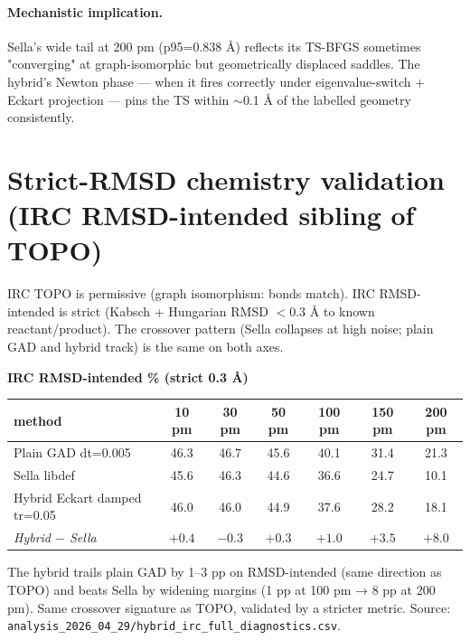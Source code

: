 \documentclass[11pt]{article}
\begin{document}
\paragraph{Mechanistic implication.} Sella's wide tail at 200 pm
(p95=0.838 Å) reflects its TS-BFGS sometimes "converging" at
graph-isomorphic but geometrically displaced saddles. The hybrid's
Newton phase --- when it fires correctly under eigenvalue-switch +
Eckart projection --- pins the TS within $\sim$0.1 Å of the labelled
geometry consistently.

\section*{Strict-RMSD chemistry validation (IRC RMSD-intended sibling of TOPO)}

IRC TOPO is permissive (graph isomorphism: bonds match). IRC
RMSD-intended is strict (Kabsch + Hungarian RMSD $<0.3$ Å to known
reactant/product). The crossover pattern (Sella collapses at high
noise; plain GAD and hybrid track) is the same on both axes.

\begin{center}\small
\textbf{IRC RMSD-intended \% (strict 0.3 Å)}\\[0.4em]
\begin{tabular}{l|cccccc}
\toprule
\textbf{method} & 10 pm & 30 pm & 50 pm & 100 pm & 150 pm & 200 pm \\
\midrule
Plain GAD dt=0.005     & 46.3 & 46.7 & 45.6 & 40.1 & 31.4 & 21.3 \\
Sella libdef           & 45.6 & 46.3 & 44.6 & 36.6 & 24.7 & 10.1 \\
Hybrid Eckart damped tr=0.05 & 46.0 & 46.0 & 44.9 & 37.6 & 28.2 & 18.1 \\
\midrule
\emph{Hybrid $-$ Sella} & $+0.4$ & $-0.3$ & $+0.3$ & $+1.0$ & $+3.5$ & \textbf{$+8.0$} \\
\bottomrule
\end{tabular}
\end{center}

The hybrid trails plain GAD by 1--3 pp on RMSD-intended (same direction
as TOPO) and beats Sella by widening margins (1 pp at 100 pm → 8 pp at
200 pm). Same crossover signature as TOPO, validated by a stricter
metric. Source:
\texttt{analysis\_2026\_04\_29/hybrid\_irc\_full\_diagnostics.csv}.

\end{document}
